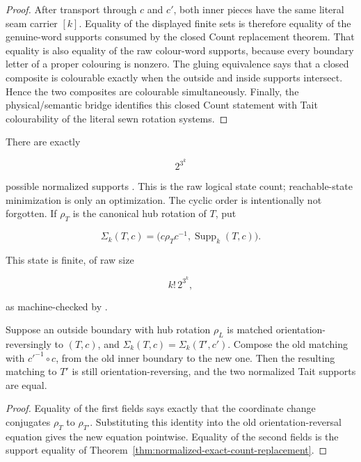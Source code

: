 \begin{proof}
After transport through \(c\) and \(c'\), both inner pieces have the same
literal seam carrier \([k]\).  Equality of the displayed finite sets is
therefore equality of the genuine-word supports consumed by the closed Count
replacement theorem.  That equality is also equality of the raw colour-word
supports, because every boundary letter of a proper colouring is nonzero.
The gluing equivalence says that a closed composite is colourable exactly when
the outside and inside supports intersect.  Hence the two composites are
colourable simultaneously.  Finally, the physical/semantic bridge identifies
this closed Count statement with Tait colourability of the literal sewn
rotation systems.
\end{proof}

There are exactly

\[
              2^{3^k}
\]

possible normalized supports
.
This is the raw logical state count; reachable-state minimization is only an
optimization.  The cyclic order is intentionally not forgotten.  If
\(\rho_T\) is the canonical hub rotation of \(T\), put

\[
 \Sigma_k(T,c)=
 \bigl(c\rho_Tc^{-1},\operatorname{Supp}_k(T,c)\bigr).
\]

This state is finite, of raw size

\[
                  k!\,2^{3^k},
\]

as machine-checked by
.

\begin{theorem}
\label{thm:normalized-seam-state-replacement}
Suppose an outside boundary with hub rotation \(\rho_L\) is matched
orientation-reversingly to \((T,c)\), and
\(\Sigma_k(T,c)=\Sigma_k(T',c')\).  Compose the old matching with
\(c'^{-1}\circ c\), from the old inner boundary to the new one.  Then
the resulting matching to \(T'\) is still orientation-reversing, and the two
normalized Tait supports are equal.
\end{theorem}

\begin{proof}
Equality of the first fields says exactly that the coordinate change conjugates
\(\rho_T\) to \(\rho_{T'}\).  Substituting this identity into the old
orientation-reversal equation gives the new equation pointwise.  Equality of
the second fields is the support equality of
Theorem~\ref{thm:normalized-exact-count-replacement}.
\end{proof}

